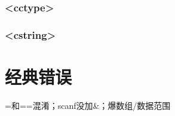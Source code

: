 \documentclass[10pt]{article}
\begin{document}
\subsubsection{<cctype>}


\subsubsection{<cstring>}


%

%
%
%
%
%
\section{经典错误}
=和==混淆；scanf没加\&；爆数组/数据范围
\end{document}
